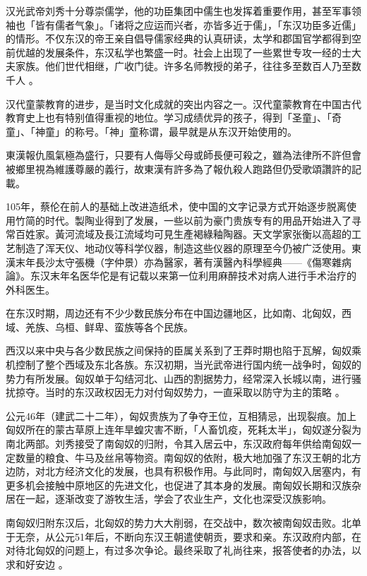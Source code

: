 汉光武帝刘秀十分尊崇儒学，他的功臣集团中儒生也发挥着重要作用，甚至军事领袖也「皆有儒者气象」。「诸将之应运而兴者，亦皆多近于儒」，「东汉功臣多近儒」的情形。不仅东汉的帝王亲自倡导儒家经典的认真研读，太学和郡国官学都得到空前优越的发展条件，东汉私学也繁盛一时。社会上出现了一些累世专攻一经的士大夫家族。他们世代相继，广收门徒。许多名师教授的弟子，往往多至数百人乃至数千人 。

汉代童蒙教育的进步，是当时文化成就的突出内容之一。汉代童蒙教育在中国古代教育史上也有特别值得重视的地位。学习成绩优异的孩子，得到「圣童」、「奇童」、「神童」的称号。「神」童称谓，最早就是从东汉开始使用的。

東漢報仇風氣極為盛行，只要有人侮辱父母或師長便可殺之，雖為法律所不許但會被鄉里視為維護尊嚴的義行，故東漢有許多為了報仇殺人跑路但仍受歌頌讚許的記載。

105年，蔡伦在前人的基础上改进造纸术，使中国的文字记录方式开始逐步脱离使用竹简的时代。製陶业得到了发展，一些以前为豪门贵族专有的用品开始进入了寻常百姓家。黃河流域及長江流域均可見生產褐綠釉陶器。天文学家张衡以高超的工艺制造了浑天仪、地动仪等科学仪器，制造这些仪器的原理至今仍被广泛使用。東漢末年長沙太守張機（字仲景）亦為醫家，著有漢醫內科學經典——《傷寒雜病論》。东汉末年名医华佗是有记载以来第一位利用麻醉技术对病人进行手术治疗的外科医生。

在东汉时期，周边还有不少少数民族分布在中国边疆地区，比如南、北匈奴，西域、羌族、乌桓、鲜卑、蛮族等各个民族。

西汉以来中央与各少数民族之间保持的臣属关系到了王莽时期也陷于瓦解，匈奴乘机控制了整个西域及东北各族。东汉初期，当光武帝进行国内统一战争时，匈奴的势力有所发展。匈奴单于勾结河北、山西的割据势力，经常深入长城以南，进行骚扰掠夺。当时的东汉政权因无力对付匈奴势力，一直采取以防守为主的策略  。

公元46年（建武二十二年），匈奴贵族为了争夺王位，互相猜忌，出现裂痕。加上匈奴所在的蒙古草原上连年旱蝗灾害不断，「人畜饥疫，死耗太半」，匈奴遂分裂为南北两部。刘秀接受了南匈奴的归附，令其入居云中，东汉政府每年供给南匈奴一定数量的粮食、牛马及丝帛等物资。南匈奴的依附，极大地加强了东汉王朝的北方边防，对北方经济文化的发展，也具有积极作用。与此同时，南匈奴入居塞内，有更多机会接触中原地区的先进文化，也促进了其本身的发展。南匈奴长期和汉族杂居在一起，逐渐改变了游牧生活，学会了农业生产，文化也深受汉族影响。

南匈奴归附东汉后，北匈奴的势力大大削弱，在交战中，数次被南匈奴击败。北单于无奈，从公元51年后，不断向东汉王朝遣使朝贡，要求和亲。东汉政府内部，在对待北匈奴的问题上，有过多次争论。最终采取了礼尚往来，报答使者的办法，以求和好安边 。

